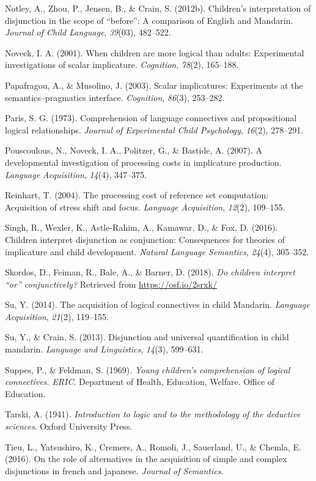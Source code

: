\documentclass[,man,floatsintext]{apa6}
\begin{document}
\leavevmode\hypertarget{ref-notley2012children}{}%
Notley, A., Zhou, P., Jensen, B., \& Crain, S. (2012b). Children's interpretation of disjunction in the scope of ``before'': A comparison of English and Mandarin. \emph{Journal of Child Language}, \emph{39}(03), 482--522.

\leavevmode\hypertarget{ref-noveck2001children}{}%
Noveck, I. A. (2001). When children are more logical than adults: Experimental investigations of scalar implicature. \emph{Cognition}, \emph{78}(2), 165--188.

\leavevmode\hypertarget{ref-papafragou2003scalar}{}%
Papafragou, A., \& Musolino, J. (2003). Scalar implicatures: Experiments at the semantics--pragmatics interface. \emph{Cognition}, \emph{86}(3), 253--282.

\leavevmode\hypertarget{ref-paris1973comprehension}{}%
Paris, S. G. (1973). Comprehension of language connectives and propositional logical relationships. \emph{Journal of Experimental Child Psychology}, \emph{16}(2), 278--291.

\leavevmode\hypertarget{ref-pouscoulous2007developmental}{}%
Pouscoulous, N., Noveck, I. A., Politzer, G., \& Bastide, A. (2007). A developmental investigation of processing costs in implicature production. \emph{Language Acquisition}, \emph{14}(4), 347--375.

\leavevmode\hypertarget{ref-reinhart2004processing}{}%
Reinhart, T. (2004). The processing cost of reference set computation: Acquisition of stress shift and focus. \emph{Language Acquisition}, \emph{12}(2), 109--155.

\leavevmode\hypertarget{ref-Singh2016}{}%
Singh, R., Wexler, K., Astle-Rahim, A., Kamawar, D., \& Fox, D. (2016). Children interpret disjunction as conjunction: Consequences for theories of implicature and child development. \emph{Natural Language Semantics}, \emph{24}(4), 305--352.

\leavevmode\hypertarget{ref-skordosEtal2018}{}%
Skordos, D., Feiman, R., Bale, A., \& Barner, D. (2018). \emph{Do children interpret ``or'' conjunctively?} Retrieved from \url{https://osf.io/2srxk/}

\leavevmode\hypertarget{ref-su2014acquisition}{}%
Su, Y. (2014). The acquisition of logical connectives in child Mandarin. \emph{Language Acquisition}, \emph{21}(2), 119--155.

\leavevmode\hypertarget{ref-su2013disjunction}{}%
Su, Y., \& Crain, S. (2013). Disjunction and universal quantification in child mandarin. \emph{Language and Linguistics}, \emph{14}(3), 599--631.

\leavevmode\hypertarget{ref-suppes1969young}{}%
Suppes, P., \& Feldman, S. (1969). \emph{Young children's comprehension of logical connectives.} \emph{ERIC}. Department of Health, Education, Welfare. Office of Education.

\leavevmode\hypertarget{ref-tarski1941logic}{}%
Tarski, A. (1941). \emph{Introduction to logic and to the methodology of the deductive sciences}. Oxford University Press.

\leavevmode\hypertarget{ref-tieu2016}{}%
Tieu, L., Yatsushiro, K., Cremers, A., Romoli, J., Sauerland, U., \& Chemla, E. (2016). On the role of alternatives in the acquisition of simple and complex disjunctions in french and japanese. \emph{Journal of Semantics}.
\end{document}
